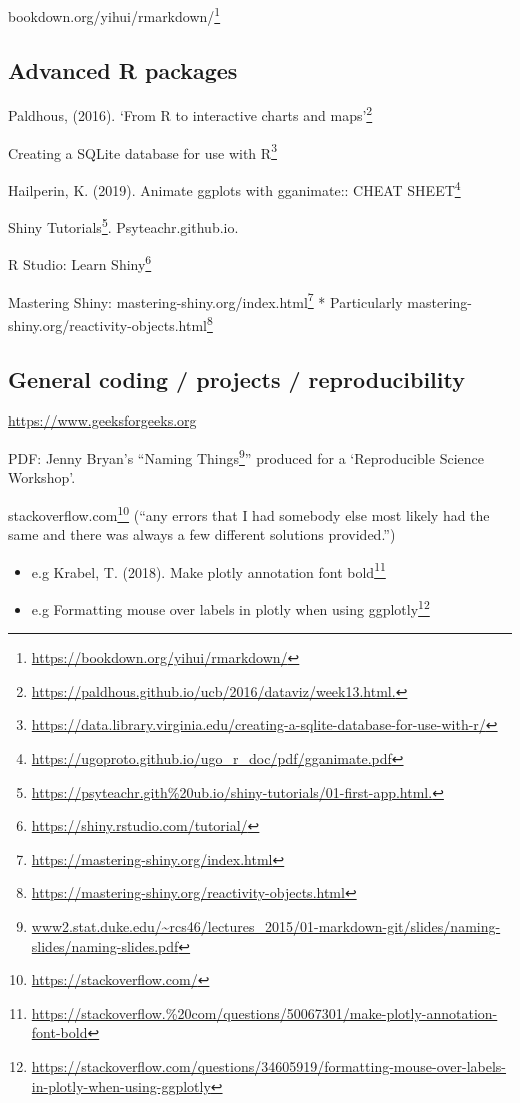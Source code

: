 \documentclass[
  12pt,
  a5paper,
]{book}
\DeclareRobustCommand{\href}[2]{#2\footnote{\url{#1}}}
\providecommand{\tightlist}{%
  \setlength{\itemsep}{0pt}\setlength{\parskip}{0pt}}
\begin{document}
\href{https://bookdown.org/yihui/rmarkdown/}{bookdown.org/yihui/rmarkdown/}

\hypertarget{advanced-r-packages}{%
\subsection{Advanced R packages}\label{advanced-r-packages}}

Paldhous, (2016). \href{https://paldhous.github.io/ucb/2016/dataviz/week13.html.}{`From R to interactive charts and maps'}

\href{https://data.library.virginia.edu/creating-a-sqlite-database-for-use-with-r/}{Creating a SQLite database for use with R}

Hailperin, K. (2019). \href{https://ugoproto.github.io/ugo_r_doc/pdf/gganimate.pdf}{Animate ggplots with gganimate:: CHEAT SHEET}

\href{https://psyteachr.gith\%20ub.io/shiny-tutorials/01-first-app.html.}{Shiny Tutorials}. Psyteachr.github.io.

R Studio: \href{https://shiny.rstudio.com/tutorial/}{Learn Shiny}

Mastering Shiny: \href{https://mastering-shiny.org/index.html}{mastering-shiny.org/index.html}
* Particularly \href{https://mastering-shiny.org/reactivity-objects.html}{mastering-shiny.org/reactivity-objects.html}

\hypertarget{general-coding-projects-reproducibility}{%
\subsection{General coding / projects / reproducibility}\label{general-coding-projects-reproducibility}}

\url{https://www.geeksforgeeks.org}

PDF: Jenny Bryan's ``\href{www2.stat.duke.edu/~rcs46/lectures_2015/01-markdown-git/slides/naming-slides/naming-slides.pdf}{Naming Things}'' produced for a `Reproducible Science Workshop'.

\href{https://stackoverflow.com/}{stackoverflow.com} (``any errors that I had somebody else most likely had the same and there was always a few different solutions provided.'')

\begin{itemize}
\tightlist
\item
  e.g Krabel, T. (2018). \href{https://stackoverflow.\%20com/questions/50067301/make-plotly-annotation-font-bold}{Make plotly annotation font bold}
\item
  e.g \href{https://stackoverflow.com/questions/34605919/formatting-mouse-over-labels-in-plotly-when-using-ggplotly}{Formatting mouse over labels in plotly when using ggplotly}
\end{itemize}
\end{document}
